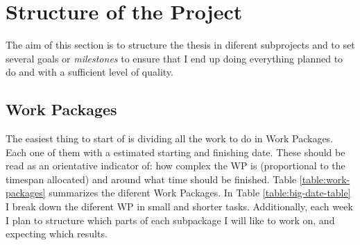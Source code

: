\documentclass{article}
\begin{document}
\newpage

\section{Structure of the Project}
The aim of this section is to structure the thesis in diferent subprojects and to set several goals or \emph{milestones} to ensure that I end up doing everything planned to do and with a sufficient level of quality.

\subsection{Work Packages}
The easiest thing to start of is dividing all the work to do in Work Packages. Each one of them with a estimated starting and finishing date. These should be read as an orientative indicator of: how complex the WP is (proportional to the timespan allocated) and around what time should be finished. Table \ref{table:work-packages} summarizes the diferent Work Packages. In Table \ref{table:big-date-table} I break down the diferent WP in small and shorter tasks. Additionally, each week I plan to structure which parts of each subpackage I will like to work on, and expecting which results.
\end{document}
